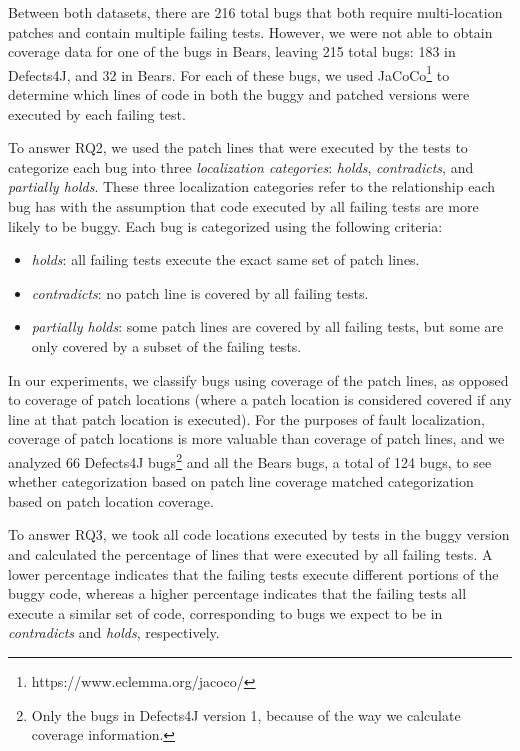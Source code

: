 \documentclass[10pt, conference]{IEEEtran}
\begin{document}
Between both datasets, there are 216 total bugs that both require multi-location
patches and contain multiple failing tests. However, we were not able to obtain coverage 
data for one of the bugs in Bears, leaving 215 total bugs: 183 in Defects4J, and 32 in
Bears. 
For each of these bugs, we used JaCoCo\footnote{https://www.eclemma.org/jacoco/}
to determine which lines of code in both the buggy and patched versions were executed
by each failing test.

To answer RQ2, we used the patch lines that were executed by the tests to categorize 
each bug into three \emph{localization categories}: \emph{holds}, \emph{contradicts}, and 
\emph{partially holds}. These three localization categories refer to the relationship each bug has 
with 
the assumption that code executed by all failing tests are more likely to be buggy. Each bug is 
categorized using the following criteria:

\begin{itemize}
\item \emph{holds}:  all failing tests execute the exact same set of patch lines.
\item \emph{contradicts}: no patch line is covered by all failing tests.
\item \emph{partially holds}: some patch lines are covered by all failing tests, but some are only 
covered by a subset of the failing tests.
\end{itemize}

In our experiments, we classify bugs using coverage of the patch lines, as opposed to 
coverage of 
patch locations (where a patch location is considered covered if any line at that patch location 
is 
executed). For the purposes of fault localization, coverage of patch locations is more valuable 
than coverage of patch lines, and we analyzed 66 Defects4J bugs\footnote{Only the 
bugs in Defects4J version 1, because of the way we calculate coverage information.}
 and all the Bears bugs, a total of 124 bugs, to see whether categorization 
based on patch line 
coverage matched categorization based on patch location coverage.

To answer RQ3, we took all code locations executed by tests in the buggy version and
calculated the percentage of lines that were executed by all failing tests. 
A lower percentage indicates that the failing tests execute different portions of the buggy 
code, whereas a higher percentage indicates that the failing tests all execute a similar
set of code, corresponding to bugs we expect to be in \emph{contradicts} and \emph{holds},
respectively.
\end{document}
